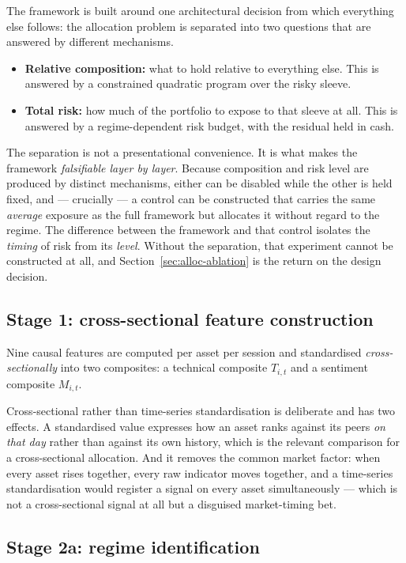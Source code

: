 The framework is built around one architectural decision from which everything else follows: the
allocation problem is separated into two questions that are answered by different mechanisms.

\begin{itemize}
\item \textbf{Relative composition:} what to hold relative to everything else. This is answered by
a constrained quadratic program over the risky sleeve.
\item \textbf{Total risk:} how much of the portfolio to expose to that sleeve at all. This is
answered by a regime-dependent risk budget, with the residual held in cash.
\end{itemize}

The separation is not a presentational convenience. It is what makes the framework
\emph{falsifiable layer by layer}. Because composition and risk level are produced by distinct
mechanisms, either can be disabled while the other is held fixed, and --- crucially --- a control
can be constructed that carries the same \emph{average} exposure as the full framework but
allocates it without regard to the regime. The difference between the framework and that control
isolates the \emph{timing} of risk from its \emph{level}. Without the separation, that experiment
cannot be constructed at all, and Section~\ref{sec:alloc-ablation} is the return on the design
decision.

\subsection{Stage 1: cross-sectional feature construction}

Nine causal features are computed per asset per session and standardised
\emph{cross-sectionally} into two composites: a technical composite $T_{i,t}$ and a sentiment
composite $M_{i,t}$.

Cross-sectional rather than time-series standardisation is deliberate and has two effects. A
standardised value expresses how an asset ranks against its peers \emph{on that day} rather than
against its own history, which is the relevant comparison for a cross-sectional allocation. And it
removes the common market factor: when every asset rises together, every raw indicator moves
together, and a time-series standardisation would register a signal on every asset simultaneously
--- which is not a cross-sectional signal at all but a disguised market-timing bet.

\subsection{Stage 2a: regime identification}

